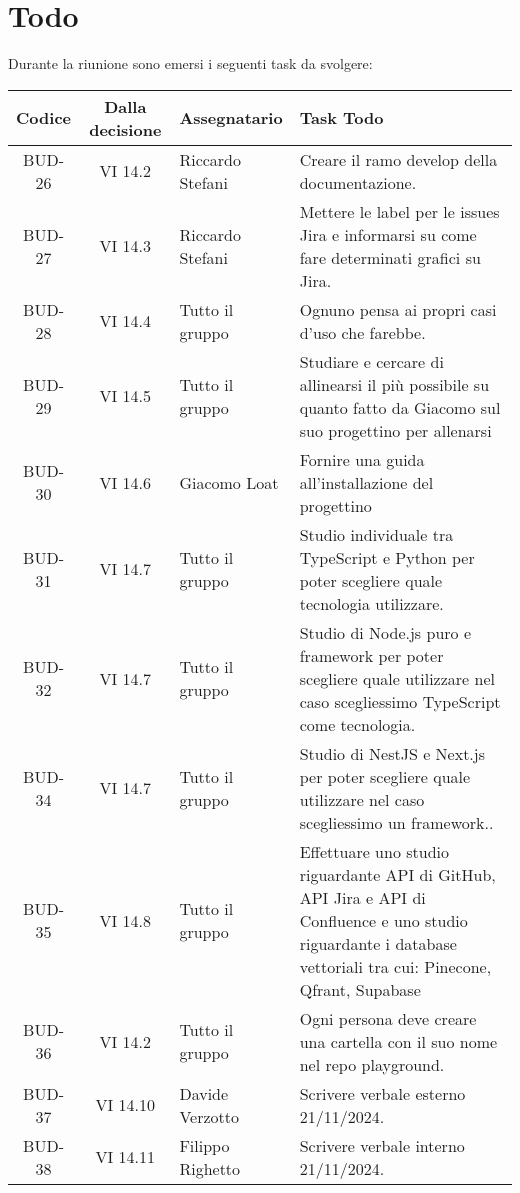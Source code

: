 
\section{Todo}

Durante la riunione sono emersi i seguenti task da svolgere:

\vspace{0.5cm}

\begin{table}[htbp]
\centering
{}
\begin{tabular}{|c|c|p{}|p{}|}
    \hline
    \rowcolor[gray]{0.75}
    \textbf{Codice} & \textbf{Dalla decisione} & \textbf{Assegnatario} & \textbf{Task Todo} \\
    \hline
    BUD-26 & VI 14.2 & Riccardo Stefani & Creare il ramo develop della documentazione. \\
    \hline
    BUD-27 & VI 14.3 & Riccardo Stefani & Mettere le label per le issues Jira e informarsi su come fare determinati grafici su Jira. \\
    \hline
    BUD-28 & VI 14.4 & Tutto il gruppo & Ognuno pensa ai propri casi d'uso che farebbe. \\
    \hline
    BUD-29 & VI 14.5 & Tutto il gruppo & Studiare e cercare di allinearsi il più possibile su quanto fatto da Giacomo sul suo progettino per allenarsi\\
    \hline
    BUD-30 & VI 14.6 & Giacomo Loat & Fornire una guida all'installazione del progettino\\
    \hline
    BUD-31 & VI 14.7 & Tutto il gruppo & Studio individuale tra TypeScript e Python per poter scegliere quale tecnologia utilizzare.\\
    \hline
    BUD-32 & VI 14.7 & Tutto il gruppo & Studio di Node.js puro e framework per poter scegliere quale utilizzare nel caso scegliessimo TypeScript come tecnologia.\\
    \hline
    BUD-34 & VI 14.7 & Tutto il gruppo & Studio di NestJS e Next.js per poter scegliere quale utilizzare nel caso scegliessimo un framework..\\
    \hline
    BUD-35 & VI 14.8 & Tutto il gruppo & Effettuare uno studio riguardante API di GitHub, API Jira e API di Confluence e uno studio riguardante i database vettoriali tra cui: Pinecone, Qfrant, Supabase  \\
    \hline
    BUD-36 & VI 14.2 & Tutto il gruppo & Ogni persona deve creare una cartella con il suo nome nel repo playground. \\
    \hline
    BUD-37 & VI 14.10 & Davide Verzotto & Scrivere verbale esterno 21/11/2024. \\
    \hline
    BUD-38 & VI 14.11 & Filippo Righetto & Scrivere verbale interno 21/11/2024. \\
    \hline
\end{tabular}
\end{table}
